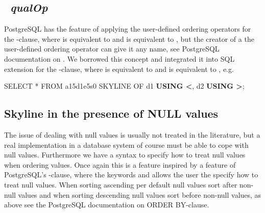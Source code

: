 %
%
%
%
%

\subsection{~\emph{qualOp}}
\label{sec:using-qualop}
PostgreSQL has the feature of applying the user-defined ordering operators for
the -clause, where  is equivalent to
 and  is equivalent to , 
but the creator of a the user-defined ordering operator can give it
any name, see PostgreSQL documentation on
.  We
borrowed this concept and integrated it into SQL extension for the
-clause, where  is equivalent to
 and  is equivalent to
, e.g.

\begin{sql}
SELECT * FROM a15d1e5s0 SKYLINE OF d1 \textbf{USING <}, d2 \textbf{USING >};
\end{sql}


\subsection{Skyline in the presence of NULL values}
\label{sec:nullvalues}
The issue of dealing with null values is usually not treated in the
literature, but a real implementation in a database system of course
must be able to cope with null values.  Furthermore we have a syntax
to specify how to treat null values when ordering values.  Once again this is a feature
inspired by a feature of PostgreSQL's -clause, where
the keywords  and  allows
the user the specify how to treat null values.  
When sorting ascending
per default null values sort after non-null values and when sorting
descending null values sort before non-null values, as above see the
PostgreSQL documentation on ORDER BY-clause.

